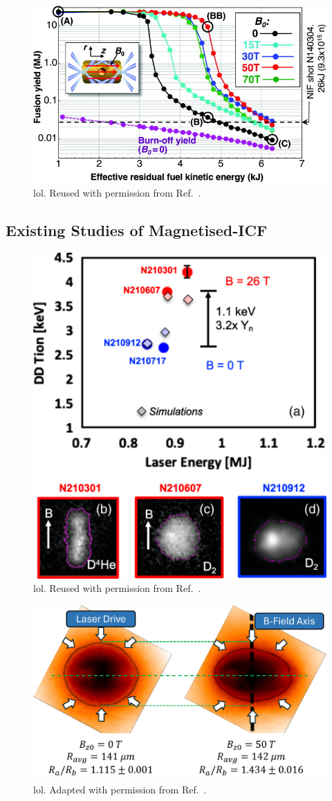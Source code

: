 \begin{figure}[t!]
    \includegraphics[width=0.75\linewidth]{Results2/Images/magicf_perkins.jpeg}
    \centering
    \caption{lol.
    Reused with permission from Ref.~\cite{perkins_potential_2017}.}%
    \label{fig:Res2_perkins_magicf}
\end{figure}


\subsection{Existing Studies of Magnetised-ICF}%
\label{sec:Res2_magicf_prevwork}


\begin{figure}[t!]
    \includegraphics[width=0.5\linewidth]{Results2/Images/magnif_yield_inc.png}
    \centering
    \caption{lol.
    Reused with permission from Ref.~\cite{moody_increased_2022}.}%
    \label{fig:Res2_moody_magnif}
\end{figure}


\begin{figure}[t!]
    \includegraphics[width=0.6\linewidth]{Results2/Images/MagP2_Bose.png}
    \centering
    \caption{lol.
    Adapted with permission from Ref.~\cite{bose_effect_2022}.}%
    \label{fig:Res2_Bose_magp2}
\end{figure}


